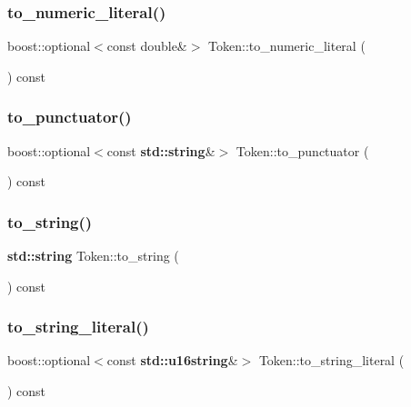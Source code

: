 \subsubsection{\texorpdfstring{to\+\_\+numeric\+\_\+literal()}{to\_numeric\_literal()}}
{\footnotesize\ttfamily boost\+::optional$<$const double\&$>$ Token\+::to\+\_\+numeric\+\_\+literal (\begin{DoxyParamCaption}{ }\end{DoxyParamCaption}) const}

\mbox{\label{class_token_af444d77cf7f485541298bdab14ef31d7}} 
\subsubsection{\texorpdfstring{to\+\_\+punctuator()}{to\_punctuator()}}
{\footnotesize\ttfamily boost\+::optional$<$const \textbf{ std\+::string}\&$>$ Token\+::to\+\_\+punctuator (\begin{DoxyParamCaption}{ }\end{DoxyParamCaption}) const}

\mbox{\label{class_token_a602aa1415de3415044205333495e72f5}} 
\subsubsection{\texorpdfstring{to\+\_\+string()}{to\_string()}}
{\footnotesize\ttfamily \textbf{ std\+::string} Token\+::to\+\_\+string (\begin{DoxyParamCaption}{ }\end{DoxyParamCaption}) const\hspace{0.3cm}{\ttfamily [inline]}}

\mbox{\label{class_token_aa418feead325e2dc8a03c36f912ece70}} 
\subsubsection{\texorpdfstring{to\+\_\+string\+\_\+literal()}{to\_string\_literal()}}
{\footnotesize\ttfamily boost\+::optional$<$const \textbf{ std\+::u16string}\&$>$ Token\+::to\+\_\+string\+\_\+literal (\begin{DoxyParamCaption}{ }\end{DoxyParamCaption}) const}

